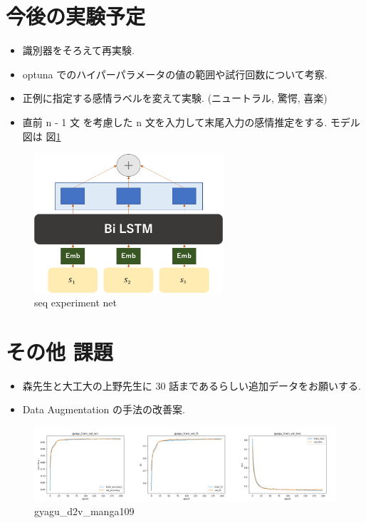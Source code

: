 \documentclass[twocolumn]{jarticle}     %
\begin{document}
\section{今後の実験予定}
\begin{itemize}
  \item 識別器をそろえて再実験.
  \item optuna でのハイパーパラメータの値の範囲や試行回数について考察.
  \item 正例に指定する感情ラベルを変えて実験. (ニュートラル, 驚愕, 喜楽)
  \item 直前 n - 1 文 を考慮した n 文を入力して末尾入力の感情推定をする. モデル図は 図\ref{fig:seq}
\end{itemize}

\begin{figure}[htb]
  \begin{center} %
    \includegraphics[width=7.0cm]{net.png}
    \caption{seq experiment net} %
    \label{fig:seq} %
  \end{center}
\end{figure}

\section{その他 課題}
\begin{itemize}
  \item 森先生と大工大の上野先生に 30 話まであるらしい追加データをお願いする.
  \item Data Augmentation の手法の改善案.
\end{itemize}





\clearpage
\begin{figure}[h]
  \begin{center} %
    \includegraphics[width=14.0cm]{gyagu_d2v_manga109.png}
    \caption{gyagu\_d2v\_manga109} %
    \label{fig:gyagu_d2v_manga109} %
  \end{center}
\end{figure}
\end{document}

